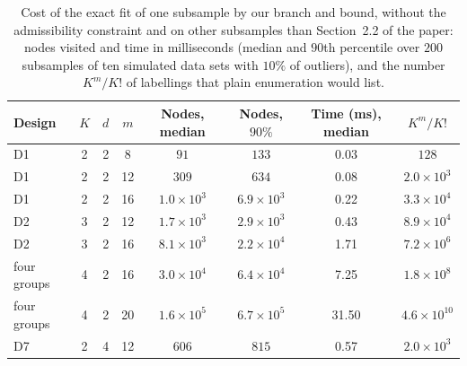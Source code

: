 \begin{table}[htbp]
\centering
\small
\caption{Cost of the exact fit of one subsample by our branch and bound, without the admissibility constraint and on other subsamples than Section~2.2 of the paper: nodes visited and time in milliseconds (median and $90$th percentile over $200$ subsamples of ten simulated data sets with $10\%$ of outliers), and the number $K^{m}/K!$ of labellings that plain enumeration would list.}
\label{tab:S22}
\begin{tabular}{lccccccc}
\toprule
Design & $K$ & $d$ & $m$ & Nodes, median & Nodes, $90\%$ & Time (ms), median & $K^{m}/K!$ \\
\midrule
D1 & 2 & 2 & 8 & $91$ & $133$ & 0.03 & $128$ \\
D1 & 2 & 2 & 12 & $309$ & $634$ & 0.08 & $2.0\times10^{3}$ \\
D1 & 2 & 2 & 16 & $1.0\times10^{3}$ & $6.9\times10^{3}$ & 0.22 & $3.3\times10^{4}$ \\
D2 & 3 & 2 & 12 & $1.7\times10^{3}$ & $2.9\times10^{3}$ & 0.43 & $8.9\times10^{4}$ \\
D2 & 3 & 2 & 16 & $8.1\times10^{3}$ & $2.2\times10^{4}$ & 1.71 & $7.2\times10^{6}$ \\
four groups & 4 & 2 & 16 & $3.0\times10^{4}$ & $6.4\times10^{4}$ & 7.25 & $1.8\times10^{8}$ \\
four groups & 4 & 2 & 20 & $1.6\times10^{5}$ & $6.7\times10^{5}$ & 31.50 & $4.6\times10^{10}$ \\
D7 & 2 & 4 & 12 & $606$ & $815$ & 0.57 & $2.0\times10^{3}$ \\
\bottomrule
\end{tabular}
\end{table}